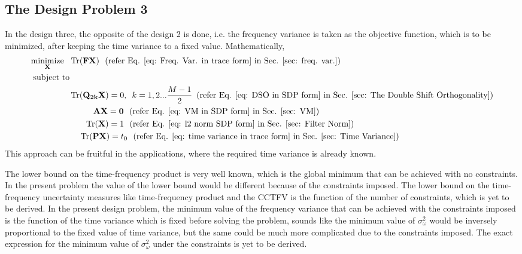 \subsection{The Design Problem 3}
\label{sub: The Design Problem 3}
In the design three, the opposite of the design 2 is done, i.e. the frequency variance is taken as the objective function, which is to be minimized, after keeping the time variance to a fixed value. Mathematically,
\begin{eqnarray}
\begin{aligned}
\underset{\mathbf{X}} {\text{minimize}}\,\,\,\, & \operatorname{Tr}(\mathbf{FX})\,\,\,\,  (\text{refer Eq. \ref{eq: Freq. Var. in trace form} in Sec. \ref{sec: freq. var.}})
\\ \text{subject to} &\\
& \operatorname{Tr}(\mathbf{Q_{2k}X}) = {0}, \,\,\, k=1,2...\frac{M-1}{2} \,\,\,(\text{refer Eq. \ref{eq: DSO in SDP form} in Sec. \ref{sec: The Double Shift Orthogonality}})
\\&\,\,\,\,\,\,\,\,\,\,\,\,\,\,\,\,\, \mathbf{AX} = \mathbf{0} \,\,\,\, (\text{refer Eq. \ref{eq: VM in SDP form} in Sec. \ref{sec: VM}}) 
\\&\,\,\,\,\,\,\,\,\,\,\, \operatorname{Tr}(\mathbf{X}) = {1} \,\,\,\, (\text{refer Eq. \ref{eq: l2 norm SDP form} in Sec. \ref{sec: Filter Norm}})
\\ &\,\,\,\,\,\,\, \operatorname{Tr}(\mathbf{PX}) = t_0 \,\,\,\, (\text{refer Eq. \ref{eq: time variance in trace form} in Sec. \ref{sec: Time Variance}})
\end{aligned}
\end{eqnarray}
This approach can be fruitful in the applications, where the required time variance is already known. 

The lower bound on the time-frequency product is very well known, which is the global minimum that can be achieved with no constraints. In the present problem the value of the lower bound would be different because of the constraints imposed. The lower bound on the time-frequency uncertainty measures like time-frequency product and the CCTFV is the function of the number of constraints, which is yet to be derived. In the present design problem, the minimum value of the frequency variance that can be achieved with the constraints imposed is the function of the time variance which is fixed before solving the problem, sounds like the minimum value of $\sigma_\omega^2$ would be inversely proportional to the fixed value of time variance, but the same could be much more complicated due to the constraints imposed. The exact expression for the minimum value of $\sigma_\omega^2$ under the constraints is yet to be derived.

